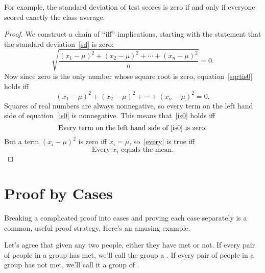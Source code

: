 For example, the standard deviation of test scores is zero if and only
if everyone scored exactly the class average.

\begin{proof}
We construct a chain of ``iff'' implications, starting with the
statement that the standard deviation~\eqref{sd} is zero:
%
\begin{equation}\label{sqrtis0}
\sqrt{\frac{(x_1 - \mu)^2 + (x_2 - \mu)^2 + \cdots + (x_n - \mu)^2}{n}} = 0.
\end{equation}
%
Now since zero is the only number whose square root is zero,
equation~\eqref{sqrtis0} holds iff
\begin{equation}\label{is0}
(x_1 - \mu)^2 + (x_2 - \mu)^2 + \cdots + (x_n - \mu)^2 = 0.
\end{equation}
Squares of real numbers are always nonnegative, so every term on the
left hand side of equation~\eqref{is0} is nonnegative.  This means
that~\eqref{is0} holds iff
\begin{equation}\label{every}
\text{Every term on the left hand side of~\eqref{is0} is zero.}
\end{equation}
But a term $(x_i - \mu)^2$ is zero iff $x_i=\mu$, so~\eqref{every} is true
iff
\[
\text{Every $x_i$ equals the mean.}
\]

\end{proof}

\iffalse

\begin{notesproblem}
Reformulate the proof of the Distributive Law for Sets as a chain of
if-and-only-if implications.
\end{notesproblem}
\fi


\section{Proof by Cases}
Breaking a complicated proof into cases and proving each case separately
is a common, useful proof strategy.  Here's an amusing example.

Let's agree that given any two people, either they have met or not.  If
every pair of people in a group has met, we'll call the group a
.  If every pair of people in a group has not met, we'll call
it a group of .

